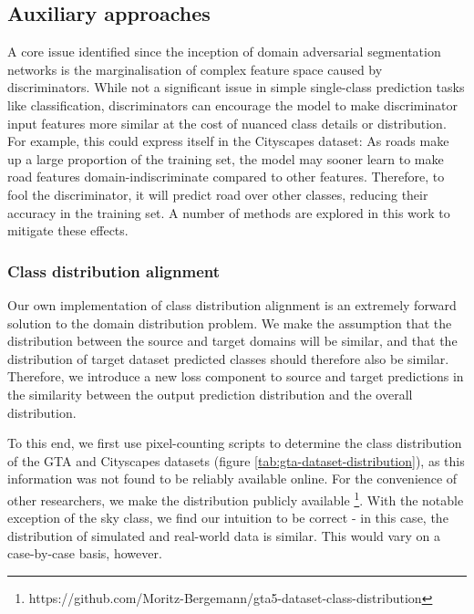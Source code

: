 \documentclass[a4paper,12pt]{report}
\begin{document}
\subsection{Auxiliary approaches}
A core issue identified since the inception of domain adversarial segmentation networks \cite{hoffman_fcns_2016} is the marginalisation of complex feature space caused by discriminators. While not a significant issue in simple single-class prediction tasks like classification, discriminators can encourage the model to make discriminator input features more similar at the cost of nuanced class details or distribution. For example, this could express itself in the Cityscapes dataset: As roads make up a large proportion of the training set, the model may sooner learn to make road features domain-indiscriminate compared to other features. Therefore, to fool the discriminator, it will predict road over other classes, reducing their accuracy in the training set. A number of methods are explored in this work to mitigate these effects.

\subsubsection{Class distribution alignment}
Our own implementation of class distribution alignment is an extremely forward solution to the domain distribution problem. We make the assumption that the distribution between the source and target domains will be similar, and that the distribution of target dataset predicted classes should therefore also be similar. Therefore, we introduce a new loss component to source and target predictions in the similarity between the output prediction distribution and the overall distribution.

To this end, we first use pixel-counting scripts to determine the class distribution of the GTA and Cityscapes datasets (figure \ref{tab:gta-dataset-distribution}), as this information was not found to be reliably available online. For the convenience of other researchers, we make the distribution publicly available \footnote{https://github.com/Moritz-Bergemann/gta5-dataset-class-distribution}. With the notable exception of the sky class, we find our intuition to be correct - in this case, the distribution of simulated and real-world data is similar. This would vary on a case-by-case basis, however.
\end{document}

